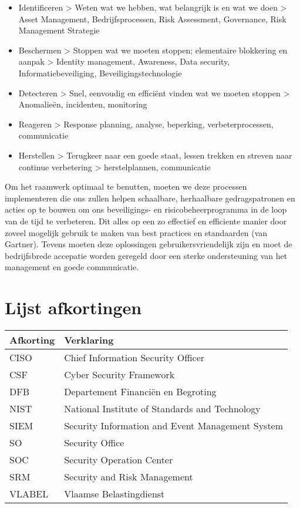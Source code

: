 \documentclass[11pt]{article}
\begin{document}
\begin{itemize}
\item Identificeren > Weten wat we hebben, wat belangrijk is en wat we doen > Asset Management, Bedrijfsprocessen, Risk Assessment, Governance, Risk Management Strategie
\item Beschermen > Stoppen wat we moeten stoppen; elementaire blokkering en aanpak > Identity management, Awareness, Data security, Informatiebeveiliging, Beveiligingstechnologie
\item Detecteren > Snel, eenvoudig en efficiënt vinden wat we moeten stoppen > Anomalieën, incidenten, monitoring
\item Reageren > Response planning, analyse, beperking, verbeterprocessen, communicatie
\item Herstellen > Terugkeer naar een goede staat, lessen trekken en streven naar continue verbetering > herstelplannen, communicatie
\end{itemize}

Om het raamwerk optimaal te benutten, moeten we deze processen implementeren die ons zullen helpen schaalbare, herhaalbare gedragspatronen en acties op te bouwen om ons beveiligings- en risicobeheerprogramma in de loop van de tijd te verbeteren. Dit alles op een zo effectief en efficiente manier door zoveel mogelijk gebruik te maken van best practices en standaarden (van Gartner). Tevens moeten deze oplossingen gebruikersvriendelijk zijn en moet de bedrijfsbrede accepatie worden geregeld door een sterke ondersteuning van het management en goede communicatie.


\section{Lijst afkortingen}
\label{sec:orge8235ee}
\begin{center}
\begin{tabular}{ll}
\hline
Afkorting & Verklaring\\
\hline
CISO & Chief Information Security Officer\\
CSF & Cyber Security Framework\\
DFB & Departement Financiën en Begroting\\
NIST & National Institute of Standards and Technology\\
SIEM & Security Information and Event Management System\\
SO & Security Office\\
SOC & Security Operation Center\\
SRM & Security and Risk Management\\
VLABEL & Vlaamse Belastingdienst\\
\hline
\end{tabular}
\end{center}
\end{document}
